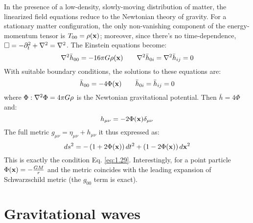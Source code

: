 In the presence of a low-density, slowly-moving distribution of matter, the linearized field equations reduce to the Newtonian theory of gravity. For a stationary matter configuration, the only non-vanishing component of the energy-momentum tensor is $ T_{00} = \rho(\mathbf{x}) $; moreover, since there's no time-dependence, $ \Box = -\partial_t^2 + \nabla^2 = \nabla^2 $. The Einstein equations become:
\begin{equation*}
  \nabla^2 \bar{h}_{00} = -16\pi G \rho(\mathbf{x})
  \qquad
  \nabla^2 \bar{h}_{0i} = \nabla^2 \bar{h}_{ij} = 0
\end{equation*}
With suitable boundary conditions, the solutions to these equations are:
\begin{equation*}
  \bar{h}_{00} = -4 \Phi(\mathbf{x})
  \qquad
  \bar{h}_{0i} = \bar{h}_{ij} = 0
\end{equation*}
where $ \Phi : \nabla^2 \Phi = 4\pi G \rho $ is the Newtonian gravitational potential. Then $ \bar{h} = 4 \Phi $ and:
\begin{equation*}
  h_{\mu \nu} = -2\Phi(\mathbf{x}) \delta_{\mu \nu}
\end{equation*}
The full metric $ g_{\mu \nu} = \eta_{\mu \nu} + h_{\mu \nu} $ it thus expressed as:
\begin{equation*}
  ds^2 = - \left( 1 + 2\Phi(\mathbf{x}) \right) dt^2 + \left( 1 - 2\Phi(\mathbf{x}) \right) d\mathbf{x}^2
\end{equation*}
This is exactly the condition Eq. \ref{eq:1.29}. Interestingly, for a point particle $ \Phi(\mathbf{x}) = - \frac{GM}{r} $ and the metric coincides with the leading expansion of Schwarzschild metric (the $ g_{00} $ term is exact).

\section{Gravitational waves}

